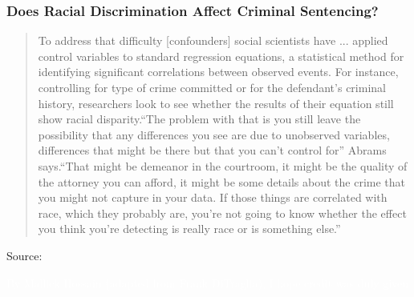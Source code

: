 \documentclass{beamer}
\begin{document}
\begin{frame}
\frametitle{Does Racial Discrimination  Affect Criminal Sentencing?}
	\footnotesize
	\begin{quote}
		To address that difficulty [confounders] social scientists have ... applied control variables to standard regression equations, a statistical method for identifying significant correlations between observed events. For instance, controlling for type of crime committed or for the defendant’s criminal history, researchers look to see whether the results of their equation still show racial disparity.\alert{``The problem with that is you still leave the possibility that any differences you see are due to unobserved variables, differences that might be there but that you can't control for''} Abrams says.``That might be demeanor in the courtroom, it might be the quality of the attorney you can afford, it might be some details about the crime that you might not capture in your data. If those things are correlated with race, which they probably are, you're not going to know whether the effect you think you're detecting is really race or is something else.''
	\end{quote}
	
	\tiny{Source: \href{https://www.law.upenn.edu/live/news/2170-new-study-by-professor-david-s-abrams-confirms}{}}
	
	\textcolor{white}{By Mallick Hossain (adapted from Frank DiTraglia), I hope credit was duly given}
\end{frame}

\end{document}
